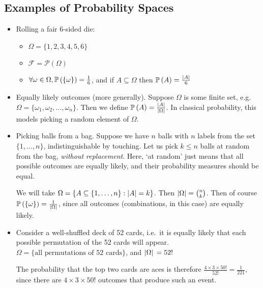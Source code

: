 \subsection{Examples of Probability Spaces}
\begin{itemize}
	\item Rolling a fair 6-sided die:
	      \begin{itemize}
		      \item \(\Omega = \{ 1, 2, 3, 4, 5, 6 \}\)
		      \item \(\mathcal F = \mathcal P(\Omega)\)
		      \item \(\forall \omega \in \Omega, \mathbb{P}\left({\{ \omega \}}\right) = \frac{1}{6}\), and if \(A \subseteq \Omega\) then \(\mathbb{P}\left({A}\right) = \frac{\abs{A}}{6}\)
	      \end{itemize}
	      
	\item Equally likely outcomes (more generally).
	      Suppose \(\Omega\) is some finite set, e.g.
	      \(\Omega = \{ \omega_1, \omega_2, \dots, \omega_n \}\).
	      Then we define \(\mathbb{P}\left({A}\right) = \frac{\abs{A}}{\abs{\Omega}}\).
	      In classical probability, this models picking a random element of \(\Omega\).
	      
	\item Picking balls from a bag.
	      Suppose we have \(n\) balls with \(n\) labels from the set \(\{1, \dots, n\}\), indistinguishable by touching.
	      Let us pick \(k \leq n\) balls at random from the bag, \textit{without replacement}.
	      Here, `at random' just means that all possible outcomes are equally likely, and their probability measures should be equal.
	      
	      We will take \(\Omega = \{ A \subseteq \{1, \dots, n\} : \abs{A} = k \}\).
	      Then \(\abs{\Omega} = \binom{n}{k}\).
	      Then of course \(\mathbb{P}\left({\{ \omega \}}\right) = \frac{1}{\abs*{\Omega}}\), since all outcomes (combinations, in this case) are equally likely.
	      
	\item Consider a well-shuffled deck of 52 cards, i.e.\ it is equally likely that each possible permutation of the 52 cards will appear.
	      \(\Omega = \{ \text{all permutations of 52 cards} \}\), and \(\abs*{\Omega} = 52!
	      \)
	      
	      The probability that the top two cards are aces is therefore \(\frac{4 \times 3 \times 50!}{52!} = \frac{1}{221}\), since there are \(4 \times 3 \times 50!
	      \) outcomes that produce such an event.
	      

\end{itemize}
